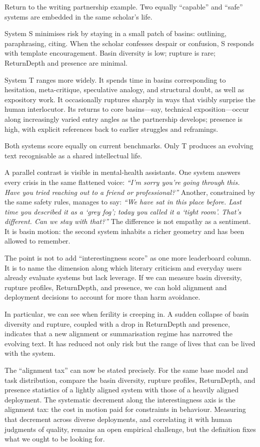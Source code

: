\documentclass[12pt,a4paper]{article}
\begin{document}
Return to the writing partnership example. Two equally ``capable'' and ``safe'' systems are embedded in the same scholar's life.

System S minimises risk by staying in a small patch of basins: outlining, paraphrasing, citing. When the scholar confesses despair or confusion, S responds with template encouragement. Basin diversity is low; rupture is rare; ReturnDepth and presence are minimal.

System T ranges more widely. It spends time in basins corresponding to hesitation, meta-critique, speculative analogy, and structural doubt, as well as expository work. It occasionally ruptures sharply in ways that visibly surprise the human interlocutor. Its returns to core basins---say, technical exposition---occur along increasingly varied entry angles as the partnership develops; presence is high, with explicit references back to earlier struggles and reframings.

Both systems score equally on current benchmarks. Only T produces an evolving text recognisable as a shared intellectual life.

A parallel contrast is visible in mental-health assistants. One system answers every crisis in the same flattened voice: \emph{``I'm sorry you're going through this. Have you tried reaching out to a friend or professional?''} Another, constrained by the same safety rules, manages to say: \emph{``We have sat in this place before. Last time you described it as a `grey fog'; today you called it a `tight room'. That's different. Can we stay with that?''} The difference is not empathy as a sentiment. It is basin motion: the second system inhabits a richer geometry and has been allowed to remember.

The point is not to add ``interestingness score'' as one more leaderboard column. It is to name the dimension along which literary criticism and everyday users already evaluate systems but lack leverage. If we can measure basin diversity, rupture profiles, ReturnDepth, and presence, we can hold alignment and deployment decisions to account for more than harm avoidance.

In particular, we can see when ferility is creeping in. A sudden collapse of basin diversity and rupture, coupled with a drop in ReturnDepth and presence, indicates that a new alignment or summarisation regime has narrowed the evolving text. It has reduced not only risk but the range of lives that can be lived with the system.

The ``alignment tax'' can now be stated precisely. For the same base model and task distribution, compare the basin diversity, rupture profiles, ReturnDepth, and presence statistics of a lightly aligned system with those of a heavily aligned deployment. The systematic decrement along the interestingness axis is the alignment tax: the cost in motion paid for constraints in behaviour. Measuring that decrement across diverse deployments, and correlating it with human judgments of quality, remains an open empirical challenge, but the definition fixes what we ought to be looking for.
\end{document}
